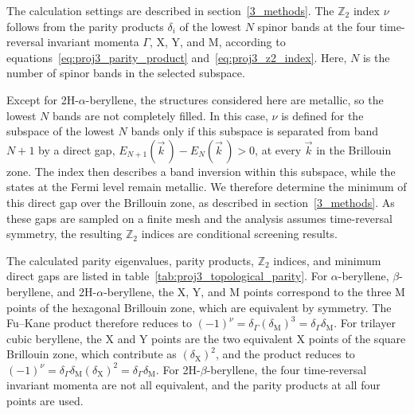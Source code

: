The calculation settings are described in section~\ref{3_methods}.
The $\mathbb{Z}_2$ index $\nu$ follows from the parity products $\delta_i$ of the lowest $N$ spinor bands at the four time-reversal invariant momenta $\Gamma$,
$\mathrm{X}$,
$\mathrm{Y}$,
and $\mathrm{M}$,
according to equations~\eqref{eq:proj3_parity_product} and~\eqref{eq:proj3_z2_index}.
Here, $N$ is the number of spinor bands in the selected subspace.

Except for 2H-$\alpha$-beryllene,
the structures considered here are metallic,
so the lowest $N$ bands are not completely filled.
In this case,
$\nu$ is defined for the subspace of the lowest $N$ bands only if this subspace is separated from band $N+1$ by a direct gap,
$E_{N+1}(\vec{k}\,)-E_{N}(\vec{k}\,)>0$,
at every $\vec{k}$ in the Brillouin zone.
The index then describes a band inversion within this subspace,
while the states at the Fermi level remain metallic.
We therefore determine the minimum of this direct gap over the Brillouin zone,
as described in section~\ref{3_methods}.
As these gaps are sampled on a finite mesh and the analysis assumes time-reversal symmetry,
the resulting $\mathbb{Z}_2$ indices are conditional screening results.

The calculated parity eigenvalues,
parity products,
$\mathbb{Z}_2$ indices,
and minimum direct gaps are listed in table~\ref{tab:proj3_topological_parity}.
For $\alpha$-beryllene,
$\beta$-beryllene,
and 2H-$\alpha$-beryllene,
the $\mathrm{X}$,
$\mathrm{Y}$,
and $\mathrm{M}$ points correspond to the three $\mathrm{M}$ points of the hexagonal Brillouin zone,
which are equivalent by symmetry.
The Fu--Kane product therefore reduces to
$(-1)^{\nu}=\delta_{\Gamma}(\delta_{\mathrm{M}})^3=\delta_{\Gamma}\delta_{\mathrm{M}}$.
For trilayer cubic beryllene,
the $\mathrm{X}$ and $\mathrm{Y}$ points are the two equivalent $\mathrm{X}$ points of the square Brillouin zone,
which contribute as $(\delta_{\mathrm{X}})^2$,
and the product reduces to
$(-1)^{\nu}=\delta_{\Gamma}\delta_{\mathrm{M}}(\delta_{\mathrm{X}})^2=\delta_{\Gamma}\delta_{\mathrm{M}}$.
For 2H-$\beta$-beryllene,
the four time-reversal invariant momenta are not all equivalent,
and the parity products at all four points are used.

